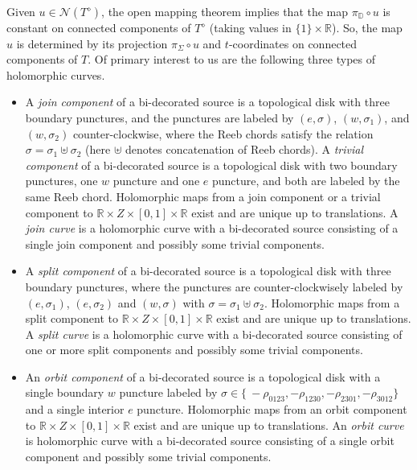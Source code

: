 \documentclass{amsart}
\theoremstyle{definition}
\theoremstyle{remark}
\numberwithin{equation}{section}
\numberwithin{equation}{section} \makeatletter
\begin{document}
 Given $u\in \mathcal{N}(T^\diamond)$, the open mapping theorem implies that the map $\pi_\mathbb{D}\circ u$ is constant on connected components of $T^\diamond$ (taking values in $\{1\}\times \mathbb{R}$). So, the map $u$ is determined by its projection $\pi_\Sigma\circ u$ and $t$-coordinates on connected components of $T$. Of primary interest to us are the following three types of holomorphic curves.
\begin{itemize}
\item[(Join curve)]A \emph{join component} of a bi-decorated source is a topological disk with three boundary punctures, and the punctures are labeled by $(e,\sigma)$, $(w,\sigma_1)$, and $(w,\sigma_2)$ counter-clockwise, where the Reeb chords satisfy the relation $\sigma=\sigma_1\uplus\sigma_2$ (here $\uplus$ denotes concatenation of Reeb chords). A \emph{trivial component} of a bi-decorated source is a topological disk with two boundary punctures, one $w$ puncture and one $e$ puncture, and both are labeled by the same Reeb chord. Holomorphic maps from a join component or a trivial component to $\mathbb{R}\times Z \times [0,1]\times \mathbb{R}$ exist and are unique up to translations. A \emph{join curve} is a holomorphic curve with a bi-decorated source consisting of a single join component and possibly some trivial components.
\item[(Split curve)]A \emph{split component} of a bi-decorated source is a topological disk with three boundary punctures, where the punctures are counter-clockwisely labeled by $(e,\sigma_1)$, $(e,\sigma_2)$ and $(w,\sigma)$ with $\sigma=\sigma_1\uplus\sigma_2$. Holomorphic maps from a split component to $\mathbb{R}\times Z \times [0,1]\times \mathbb{R}$ exist and are unique up to translations. A \emph{split curve} is a holomorphic curve with a bi-decorated source consisting of one or more split components and possibly some trivial components.  
\item[(Orbit curve)]An \emph{orbit component} of a bi-decorated source is a topological disk with a single boundary $w$ puncture labeled by $\sigma\in\{\ -\rho_{0123},-\rho_{1230},-\rho_{2301},-\rho_{3012}\}$ and a single interior $e$ puncture. Holomorphic maps from an orbit component to $\mathbb{R}\times Z \times [0,1]\times \mathbb{R}$ exist and are unique up to translations. An \emph{orbit curve} is holomorphic curve with a bi-decorated source consisting of a single orbit component and possibly some trivial components.
\end{itemize}
\end{document}
